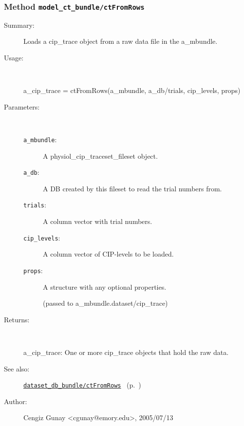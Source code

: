 \subsubsection[Method \texttt{ctFromRows}]{Method \texttt{model\_ct\_bundle/ctFromRows}}%
%
\label{ref_model_ct_bundle__ctFromRows}%
\hypertarget{ref_model_ct_bundle__ctFromRows}{}%
\begin{description}
\item[Summary:]Loads a cip\_trace object from a raw data file in the a\_mbundle.
%
\item[Usage:]~%
\begin{lyxcode}%
a\_cip\_trace = ctFromRows(a\_mbundle, a\_db/trials, cip\_levels, props)
%
\end{lyxcode}%
%
%
\item[Parameters:]~
\begin{description}%
\item[\texttt{a\_mbundle}:]
 A physiol\_cip\_traceset\_fileset object.
\item[\texttt{a\_db}:]
 A DB created by this fileset to read the trial numbers from.
\item[\texttt{trials}:]
 A column vector with trial numbers.
\item[\texttt{cip\_levels}:]
 A column vector of CIP-levels to be loaded.
\item[\texttt{props}:]
 A structure with any optional properties.

(passed to a\_mbundle.dataset/cip\_trace)\end{description}%
%
\item[Returns:]~

	a\_cip\_trace: One or more cip\_trace objects that hold the raw data.
%
%
\item[See also:]%
\hyperlink{ref_dataset_db_bundle__ctFromRows}{\texttt{dataset\_db\_bundle/ctFromRows}}%
\ (p.~\pageref{ref_dataset_db_bundle__ctFromRows})%
%
%
\item[Author:]%
Cengiz Gunay <cgunay@emory.edu>, 2005/07/13%
\end{description}
\methodline%

